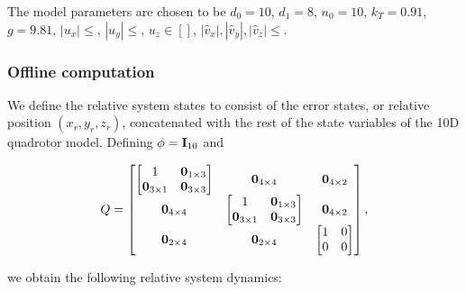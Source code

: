 The model parameters are chosen to be $d_0=10$, $d_1=8$, $n_0=10$, $k_T=0.91$, $g=9.81$, $|u_x| \le $, $|u_y| \le $, $u_z \in []$, $|\hat v_x|, |\hat v_y|, |\hat v_z| \le $.

\subsubsection{Offline computation}
We define the relative system states to consist of the error states, or relative position $(x_r, y_r, z_r)$, concatenated with the rest of the state variables of the 10D quadrotor model.
Defining $\phi = \mathbf I_{10}$ and 

\begin{equation*}
Q = 
\begin{bmatrix}
  \begin{bmatrix}
    1 & \mathbf 0_{1 \times 3} \\
    \mathbf 0_{3 \times 1} & \mathbf 0_{3 \times 3}
  \end{bmatrix} & \mathbf 0_{4\times 4} & \mathbf 0_{4\times 2} \\
  \mathbf 0_{4\times 4} & \begin{bmatrix}
    1 & \mathbf 0_{1 \times 3} \\
    \mathbf 0_{3 \times 1} & \mathbf 0_{3 \times 3}
  \end{bmatrix} &  \mathbf 0_{4\times 2} \\
  \mathbf 0_{2\times 4} & \mathbf 0_{2\times 4} & \begin{bmatrix}
    1 & 0 \\
    0 & 0
  \end{bmatrix}
\end{bmatrix},
\end{equation*}

\noindent we obtain the following relative system dynamics:

